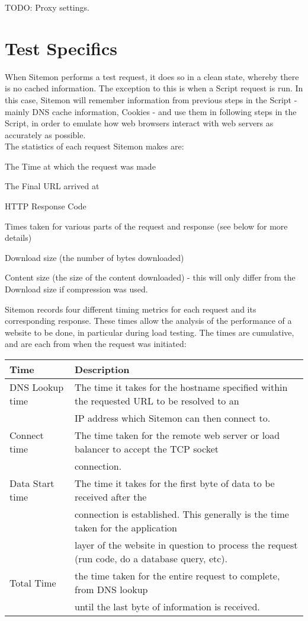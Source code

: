 \documentclass[a4paper]{article}
\newenvironment{small_list}{
\begin{itemize}
  \setlength{\itemsep}{0pt}
  \setlength{\parskip}{0pt}
  \setlength{\parsep}{0pt}
}
{\end{itemize}}
\begin{document}
TODO: Proxy settings.

\pagebreak

 \section{Test Specifics}
 
 When Sitemon performs a test request, it does so in a clean state, whereby there is no cached information. The exception to this
  is when a Script request is run. In this case, Sitemon will remember information from previous steps in the Script - mainly
 DNS cache information, Cookies - and use them in following steps in the Script, in order to emulate how web browsers interact
 with web servers as accurately as possible.\\
 
 The statistics of each request Sitemon makes are:
 \begin{small_list}
	\item The Time at which the request was made
	\item The Final URL arrived at
	\item HTTP Response Code
	\item Times taken for various parts of the request and response (see below for more details)
	\item Download size (the number of bytes downloaded)
	\item Content size (the size of the content downloaded) - this will only differ from the Download size
			if compression was used.
\end{small_list}

Sitemon records four different timing metrics for each request and its corresponding response. These times allow the analysis of
 the performance of a website to be done, in particular during load testing. The times are cumulative, and are each from
 when the request was initiated:\\

\begin{tabular}{ | l | l | }
\hline
  Time & Description \\ \hline
  DNS Lookup time & The time it takes for the hostname specified within the requested URL to be resolved to an \\
 	& IP address which Sitemon can then connect to. \\ \hline
  Connect time & The time taken for the remote web server or load balancer to accept the TCP socket \\ 
	& connection. \\ \hline
  Data Start time & The time it takes for the first byte of data to be received after the \\
 	& connection is established. This generally is the time taken for the application \\
 	& layer of the website in question to process the request (run code, do a database query, etc).\\ \hline
  Total Time & the time taken for the entire request to complete, from DNS lookup \\
 	& until the last byte of information is received. \\ \hline
\end{tabular}
\end{document}
